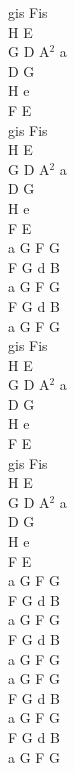 \documentclass[a5paper, 10pt]{book}
\begin{document}
\begin{minipage}[t]{0.2\textwidth}
gis Fis\\
H E\\
G D A$^2$ a\\
D G\\
H e\\
F E\vspace*{2mm}\\
gis Fis\\
H E\\
G D A$^2$ a\\
D G\\
H e\\
F E\vspace*{2mm}\\
a G F G\\
F G d B\\
a G F G\\
F G d B\\
a G F G\vspace*{2mm}\\
gis Fis\\
H E\\
G D A$^2$ a\\
D G\\
H e\\
F E\vspace*{2mm}\\
gis Fis\\
H E\\
G D A$^2$ a\\
D G\\
H e\\ 
F E\vspace*{2mm}\\
a G F G\\
F G d B\\
a G F G\\
F G d B\\
a G F G\vspace*{2mm}\\
a G F G\\
F G d B\\
a G F G\\
F G d B\\
a G F G\\

\end{minipage}

\newpage
\end{document}
